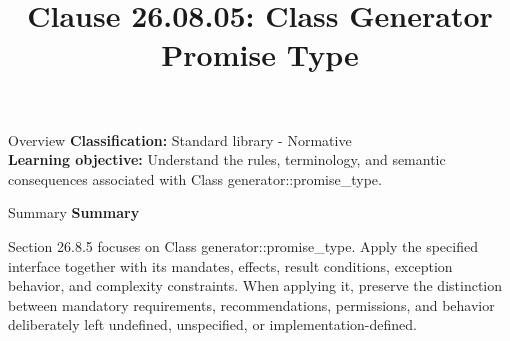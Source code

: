\documentclass[10pt,letterpaper]{article}
\title{Clause 26.08.05: Class Generator Promise Type}
\author{}
\date{}
\begin{document}
\maketitle
\begin{CornellOverviewBox}{Overview}
\textbf{Classification:} Standard library - Normative\\[2pt]
\textbf{Learning objective:} Understand the rules, terminology, and semantic consequences associated with Class generator::promise\_type.
\end{CornellOverviewBox}\begin{CornellSummaryBox}{Summary}
{\sffamily\bfseries\color{Accent} Summary}\par\vspace{3pt}Section 26.8.5 focuses on Class generator::promise\_type. Apply the specified interface together with its mandates, effects, result conditions, exception behavior, and complexity constraints. When applying it, preserve the distinction between mandatory requirements, recommendations, permissions, and behavior deliberately left undefined, unspecified, or implementation-defined.
\end{CornellSummaryBox}
\end{document}
